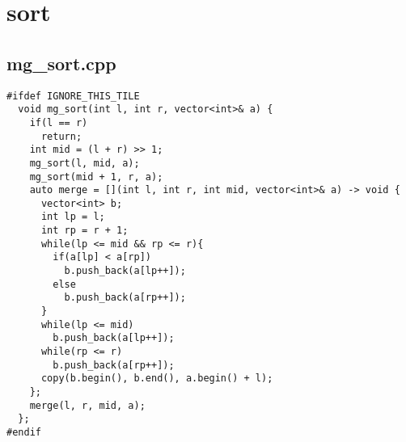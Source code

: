 \documentclass[UTF8, a4paper, titlepage, twoside]{ctexart}
\begin{document}
\clearpage
\section{sort}
\subsection{mg_sort.cpp}
\begin{verbatim}
#ifdef IGNORE_THIS_TILE
  void mg_sort(int l, int r, vector<int>& a) {
    if(l == r)
      return;
    int mid = (l + r) >> 1;
    mg_sort(l, mid, a);
    mg_sort(mid + 1, r, a);
    auto merge = [](int l, int r, int mid, vector<int>& a) -> void {
      vector<int> b;
      int lp = l;
      int rp = r + 1;
      while(lp <= mid && rp <= r){
        if(a[lp] < a[rp])
          b.push_back(a[lp++]);
        else  
          b.push_back(a[rp++]);
      }
      while(lp <= mid)
        b.push_back(a[lp++]);
      while(rp <= r)
        b.push_back(a[rp++]);
      copy(b.begin(), b.end(), a.begin() + l);
    };
    merge(l, r, mid, a);
  };
#endif
\end{verbatim}

\clearpage
\end{document}
